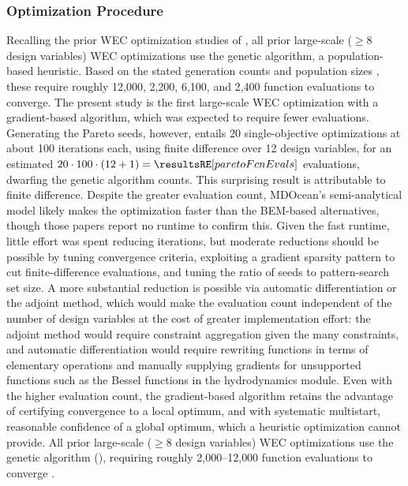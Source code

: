 \subsubsection{Optimization Procedure}
\label{remdo:sec:discussion-optimization}
\ifdefined\DISSERTATION
    Recalling the prior WEC optimization studies of , all prior large-scale ($\geq 8$ design variables) WEC optimizations use the genetic algorithm, a population-based heuristic.
    Based on the stated generation counts and population sizes \cite{khanal_multi-objective_2024,garcia-teruel_reliability-based_2021,cotten_multi-objective_2022,abdulkadir_control_2024}, these require roughly 12{,}000, 2{,}200, 6{,}100, and 2{,}400 function evaluations to converge.
    The present study is the first large-scale WEC optimization with a gradient-based algorithm, which was expected to require fewer evaluations.
    Generating the Pareto seeds, however, entails 20 single-objective optimizations at about 100 iterations each, using finite difference over 12 design variables, for an estimated $20\cdot100\cdot(12+1)=\resultsRE[paretoFcnEvals]$ evaluations,  dwarfing the genetic algorithm counts.
    This surprising result is attributable to finite difference.
    Despite the greater evaluation count, MDOcean's semi-analytical model likely makes the optimization faster than the BEM-based alternatives, though those papers report no runtime to confirm this.
    Given the fast runtime, little effort was spent reducing iterations, but moderate reductions should be possible by tuning convergence criteria, exploiting a gradient sparsity pattern to cut finite-difference evaluations, and tuning the ratio of seeds to pattern-search set size.
    A more substantial reduction is possible via automatic differentiation or the adjoint method, which would make the evaluation count independent of the number of design variables at the cost of greater implementation effort: the adjoint method would require constraint aggregation given the many constraints, and automatic differentiation would require rewriting functions in terms of elementary operations and manually supplying gradients for unsupported functions such as the Bessel functions in the hydrodynamics module.
    Even with the higher evaluation count, the gradient-based algorithm retains the advantage of certifying convergence to a local optimum, and with systematic multistart, reasonable confidence of a global optimum, which a heuristic optimization cannot provide.
\else
    All prior large-scale ($\geq 8$ design variables) WEC optimizations use the genetic algorithm (), requiring roughly 2{,}000--12{,}000 function evaluations to converge \cite{khanal_multi-objective_2024,garcia-teruel_reliability-based_2021,cotten_multi-objective_2022,abdulkadir_control_2024}.
